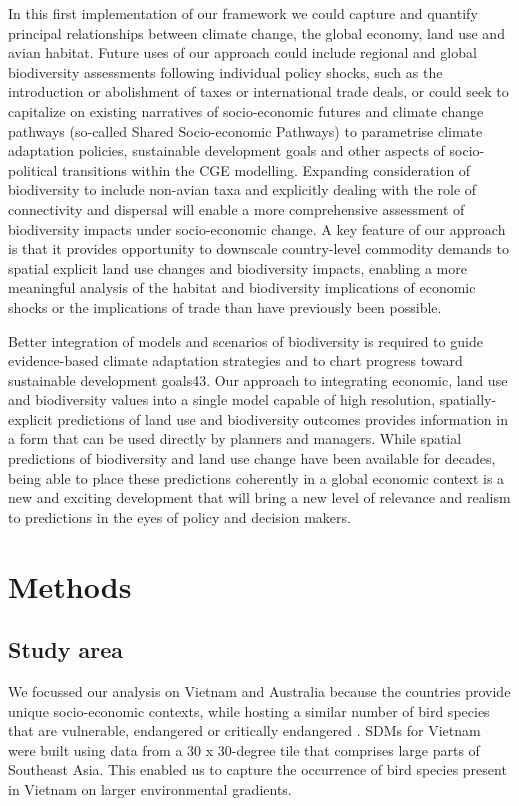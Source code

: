 In this first implementation of our framework we could capture and quantify principal relationships between climate change, the global economy, land use and avian habitat. Future uses of our approach could include regional and global biodiversity assessments following individual policy shocks, such as the introduction or abolishment of taxes or international trade deals, or could seek to capitalize on existing narratives of socio-economic futures and climate change pathways (so-called Shared Socio-economic Pathways) \citep{van_vuuren_climate_2014} to parametrise climate adaptation policies, sustainable development goals and other aspects of socio-political transitions within the CGE modelling. Expanding consideration of biodiversity to include non-avian taxa and explicitly dealing with the role of connectivity and dispersal will enable a more comprehensive assessment of biodiversity impacts under socio-economic change. A key feature of our approach is that it provides opportunity to downscale country-level commodity demands to spatial explicit land use changes and biodiversity impacts, enabling a more meaningful analysis of the habitat and biodiversity implications of economic shocks or the implications of trade than have previously been possible. 

Better integration of models and scenarios of biodiversity is required to guide evidence-based climate adaptation strategies and to chart progress toward sustainable development goals43. Our approach to integrating economic, land use and biodiversity values into a single model capable of high resolution, spatially-explicit predictions of land use and biodiversity outcomes provides information in a form that can be used directly by planners and managers. While spatial predictions of biodiversity and land use change have been available for decades, being able to place these predictions coherently in a global economic context is a new and exciting development that will bring a new level of relevance and realism to predictions in the eyes of policy and decision makers.

\section{Methods}
\subsection{Study area} 
We focussed our analysis on Vietnam and Australia because the countries provide unique socio-economic contexts, while hosting a similar number of bird species that are vulnerable, endangered or critically endangered \citep{birdlife_international_country_2018, birdlife_international_country_2018-1}. SDMs for Vietnam were built using data from a 30 x 30-degree tile that comprises large parts of Southeast Asia. This enabled us to capture the occurrence of bird species present in Vietnam on larger environmental gradients.

